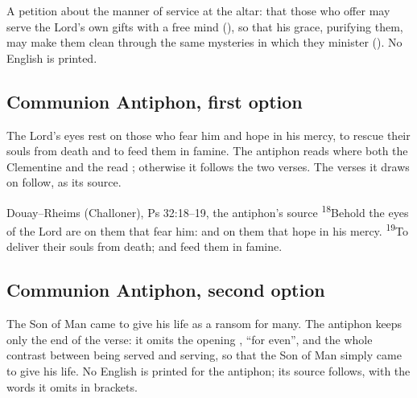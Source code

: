 
\noindent A petition about the manner of service at the altar: that those who
offer may serve the Lord's own gifts with a free mind (), so that his grace, purifying them, may make them clean through the
same mysteries in which they minister (). No English is printed.

\subsection{Communion Antiphon, first option}
\label{proper-communion-antiphon-a}


\noindent The Lord's eyes rest on those who fear him and hope in his mercy, to
rescue their souls from death and to feed them in famine. The antiphon reads
 where both the Clementine and the  read
; otherwise it follows the two verses. The verses it draws on
follow, as its source.

\begin{englishwitness}{Douay--Rheims (Challoner), Ps 32:18--19, the antiphon's source}
\textsuperscript{18}Behold the eyes of the Lord are on them that fear him: and
on them that hope in his mercy. \textsuperscript{19}To deliver their souls from
death; and feed them in famine.
\end{englishwitness}

\subsection{Communion Antiphon, second option}
\label{proper-communion-antiphon-b}


\noindent The Son of Man came to give his life as a ransom for many. The
antiphon keeps only the end of the verse: it omits the opening ,
``for even'', and the whole contrast between being served and serving, so that
the Son of Man simply came to give his life. No English is printed for the
antiphon; its source follows, with the words it omits in brackets.

